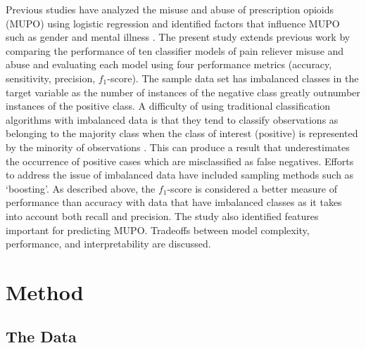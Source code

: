 \documentclass[sigconf]{acmart}
\begin{document}
Previous studies have analyzed the misuse and abuse of prescription opioids
(MUPO) using logistic regression and identified factors that influence MUPO 
such as gender and mental illness \cite{rice12, unick13, jones15, mccabe12}. 
The present study extends previous work by comparing the performance of ten 
classifier models of pain reliever misuse and abuse and evaluating each model 
using four performance metrics (accuracy, sensitivity, precision, $f_1$-score). 
The sample data set has imbalanced classes in the target variable as the 
number of instances of the negative class greatly outnumber instances of 
the positive class. A difficulty of using traditional classification 
algorithms with imbalanced data is that they tend to classify observations
as belonging to the majority class when the class of interest (positive) is 
represented by the minority of observations \cite{brown12, yun09}. This can 
produce a result that underestimates the occurrence of positive cases which 
are misclassified as false negatives. Efforts to address the issue of 
imbalanced data have included sampling methods such as `boosting'. 
As described above, the $f_1$-score is considered a better measure of 
performance than accuracy with data that have imbalanced classes as it 
takes into account both recall and precision. The study also identified 
features important for predicting MUPO. Tradeoffs between model complexity,
performance, and interpretability are discussed. 


\section{Method}

\subsection{The Data}
\end{document}
